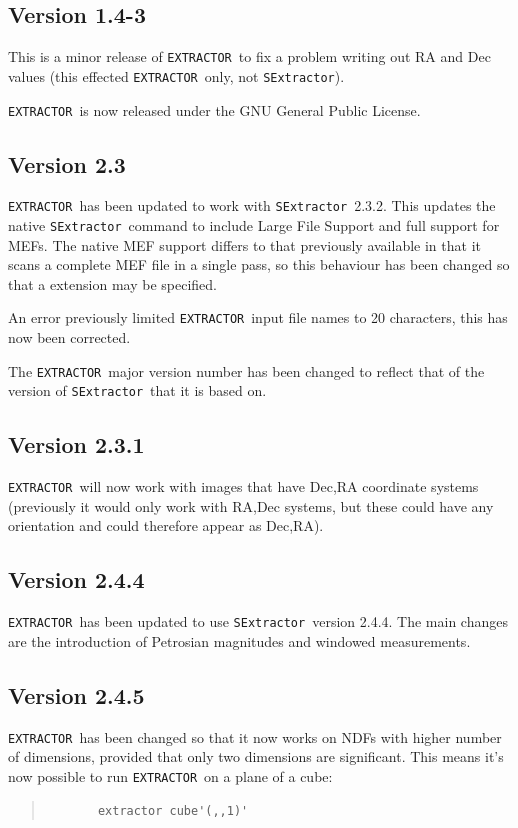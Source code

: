 \documentclass[twoside,11pt]{article}
\renewcommand{\_}{\texttt{\symbol{95}}}
\newcommand{\EXTRACTOR}{\texttt{EXTRACTOR}}
\newcommand{\SExtractor}{\texttt{SExtractor}}
\begin{document}
\subsection{Version 1.4-3}

 This is a minor release of \EXTRACTOR\ to fix a problem writing out 
 RA and Dec values (this effected \EXTRACTOR\ only, not \SExtractor).

 \EXTRACTOR\ is now released under the GNU General Public License.

\subsection{Version 2.3}

 \EXTRACTOR\ has been updated to work with \SExtractor\ 2.3.2. 
 This updates the native \SExtractor\ command to include Large File Support
 and full support for MEFs. The native MEF support differs to that previously
 available in that it scans a complete MEF file in a single pass, so this
 behaviour has been changed so that a extension may be specified.

 An error previously limited \EXTRACTOR\ input file names to 20 characters,
 this has now been corrected.

 The \EXTRACTOR\ major version number has been changed to reflect that of the
 version of \SExtractor\ that it is based on.

\subsection{Version 2.3.1}

 \EXTRACTOR\ will now work with images that have Dec,RA coordinate systems
 (previously it would only work with RA,Dec systems, but these could have
 any orientation and could therefore appear as Dec,RA).

\subsection{Version 2.4.4}

 \EXTRACTOR\ has been updated to use \SExtractor\ version 2.4.4. The main
 changes are the introduction of Petrosian magnitudes and windowed
 measurements.

\subsection{Version 2.4.5}

 \EXTRACTOR\ has been changed so that it now works on NDFs with higher
 number of dimensions, provided that only two dimensions are significant.
 This means it's now possible to run \EXTRACTOR\ on a plane of a cube:
 \begin{quote}
 \begin{verbatim}   
       extractor cube'(,,1)'
 \end{verbatim}   
 \end{quote}
\end{document}
